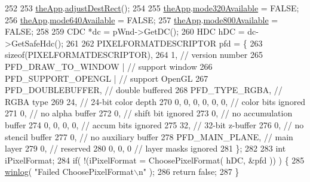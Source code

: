 \begin{DoxyCode}
{252     
253     \mbox{\hyperlink{_v_b_a_8cpp_a8095a9d06b37a7efe3723f3218ad8fb3}{theApp}}.\mbox{\hyperlink{class_v_b_a_acb822065cba8b15810c5a61fd05ca831}{adjustDestRect}}();
254     
255     \mbox{\hyperlink{_v_b_a_8cpp_a8095a9d06b37a7efe3723f3218ad8fb3}{theApp}}.\mbox{\hyperlink{class_v_b_a_adcefc742bdb15ddb902bcb2df896d298}{mode320Available}} = FALSE;
256     \mbox{\hyperlink{_v_b_a_8cpp_a8095a9d06b37a7efe3723f3218ad8fb3}{theApp}}.\mbox{\hyperlink{class_v_b_a_adc44d61208b927bde7ea49c25a2e30bc}{mode640Available}} = FALSE;
257     \mbox{\hyperlink{_v_b_a_8cpp_a8095a9d06b37a7efe3723f3218ad8fb3}{theApp}}.\mbox{\hyperlink{class_v_b_a_a3e2e940c6531daba73473c51a9916574}{mode800Available}} = FALSE;
258 
259     CDC *dc = pWnd->GetDC();
260     HDC hDC = dc->GetSafeHdc();
261 
262     PIXELFORMATDESCRIPTOR pfd = \{ 
263         \textcolor{keyword}{sizeof}(PIXELFORMATDESCRIPTOR),
264         1,                     \textcolor{comment}{// version number }
265         PFD\_DRAW\_TO\_WINDOW |   \textcolor{comment}{// support window }
266         PFD\_SUPPORT\_OPENGL |   \textcolor{comment}{// support OpenGL }
267         PFD\_DOUBLEBUFFER,      \textcolor{comment}{// double buffered }
268         PFD\_TYPE\_RGBA,         \textcolor{comment}{// RGBA type }
269         24,                    \textcolor{comment}{// 24-bit color depth }
270         0, 0, 0, 0, 0, 0,      \textcolor{comment}{// color bits ignored }
271         0,                     \textcolor{comment}{// no alpha buffer }
272         0,                     \textcolor{comment}{// shift bit ignored }
273         0,                     \textcolor{comment}{// no accumulation buffer }
274         0, 0, 0, 0,            \textcolor{comment}{// accum bits ignored }
275         32,                    \textcolor{comment}{// 32-bit z-buffer     }
276         0,                     \textcolor{comment}{// no stencil buffer }
277         0,                     \textcolor{comment}{// no auxiliary buffer }
278         PFD\_MAIN\_PLANE,        \textcolor{comment}{// main layer }
279         0,                     \textcolor{comment}{// reserved }
280         0, 0, 0                \textcolor{comment}{// layer masks ignored }
281     \};
282     
283     \textcolor{keywordtype}{int}  iPixelFormat; 
284     \textcolor{keywordflow}{if}( !(iPixelFormat = ChoosePixelFormat( hDC, &pfd )) ) \{
285         \mbox{\hyperlink{_open_g_l_8cpp_aceca31284db939464c9dc0fb15c92786}{winlog}}( \textcolor{stringliteral}{"Failed ChoosePixelFormat\(\backslash\)n"} );
286         \textcolor{keywordflow}{return} \textcolor{keyword}{false};
287     \}
}
\end{DoxyCode}
